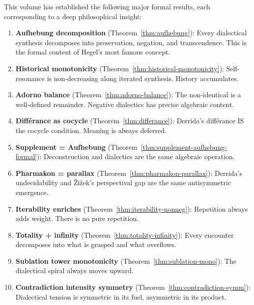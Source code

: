 \begin{remark}
This volume has established the following major formal results, each
corresponding to a deep philosophical insight:
\begin{enumerate}
\item \textbf{Aufhebung decomposition} (Theorem~\ref{thm:aufhebung}):
Every dialectical synthesis decomposes into preservation, negation, and
transcendence. This is the formal content of Hegel's most famous concept.

\item \textbf{Historical monotonicity} (Theorem~\ref{thm:historical-monotonicity}):
Self-resonance is non-decreasing along iterated synthesis. History accumulates.

\item \textbf{Adorno balance} (Theorem~\ref{thm:adorno-balance}):
The non-identical is a well-defined remainder. Negative dialectics has
precise algebraic content.

\item \textbf{Diff\'erance as cocycle} (Theorem~\ref{thm:differance}):
Derrida's diff\'erance IS the cocycle condition. Meaning is always deferred.

\item \textbf{Supplement = Aufhebung}
(Theorem~\ref{thm:supplement-aufhebung-formal}):
Deconstruction and dialectics are the same algebraic operation.

\item \textbf{Pharmakon = parallax}
(Theorem~\ref{thm:pharmakon-parallax}):
Derrida's undecidability and \v{Z}i\v{z}ek's perspectival gap are the
same antisymmetric emergence.

\item \textbf{Iterability enriches}
(Theorem~\ref{thm:iterability-nonneg}):
Repetition always adds weight. There is no pure repetition.

\item \textbf{Totality + infinity} (Theorem~\ref{thm:totality-infinity}):
Every encounter decomposes into what is grasped and what overflows.

\item \textbf{Sublation tower monotonicity} (Theorem~\ref{thm:sublation-mono}):
The dialectical spiral always moves upward.

\item \textbf{Contradiction intensity symmetry}
(Theorem~\ref{thm:contradiction-symm}):
Dialectical tension is symmetric in its fuel, asymmetric in its product.


\end{enumerate}
\end{remark}
